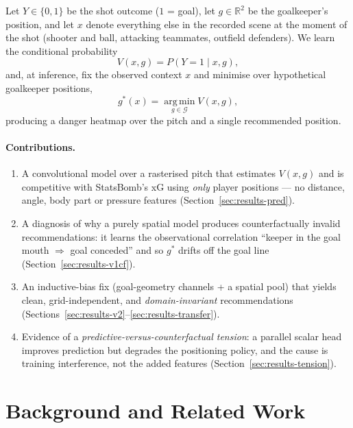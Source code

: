 \documentclass[11pt,a4paper]{article}
\newcommand{\gopt}{g^{*}}
\newcommand{\V}{V}
\newcommand{\argmin}{\operatorname*{arg\,min}}
\begin{document}
Let $Y\in\{0,1\}$ be the shot outcome ($1$ = goal), let $g\in\mathbb{R}^2$ be the
goalkeeper's position, and let $x$ denote everything else in the recorded scene
at the moment of the shot (shooter and ball, attacking teammates, outfield
defenders). We learn the conditional probability
\begin{equation}
  \V(x,g) = P(Y=1\mid x,g),
\end{equation}
and, at inference, fix the observed context $x$ and minimise over hypothetical
goalkeeper positions,
\begin{equation}
  \gopt(x) = \argmin_{g\in\mathcal{G}} \V(x,g),
  \label{eq:gstar}
\end{equation}
producing a danger heatmap over the pitch and a single recommended position.

\paragraph{Contributions.}
\begin{enumerate}\itemsep2pt
  \item A convolutional model over a rasterised pitch that estimates $\V(x,g)$
        and is competitive with StatsBomb's xG using \emph{only} player
        positions --- no distance, angle, body part or pressure features
        (Section~\ref{sec:results-pred}).
  \item A diagnosis of why a purely spatial model produces
        counterfactually invalid recommendations: it learns the observational
        correlation ``keeper in the goal mouth $\Rightarrow$ goal conceded'' and
        so $\gopt$ drifts off the goal line
        (Section~\ref{sec:results-v1cf}).
  \item An inductive-bias fix (goal-geometry channels + a spatial pool) that
        yields clean, grid-independent, and \emph{domain-invariant}
        recommendations (Sections~\ref{sec:results-v2}--\ref{sec:results-transfer}).
  \item Evidence of a \emph{predictive-versus-counterfactual tension}: a
        parallel scalar head improves prediction but degrades the positioning
        policy, and the cause is training interference, not the added features
        (Section~\ref{sec:results-tension}).
\end{enumerate}

\section{Background and Related Work}
\end{document}
